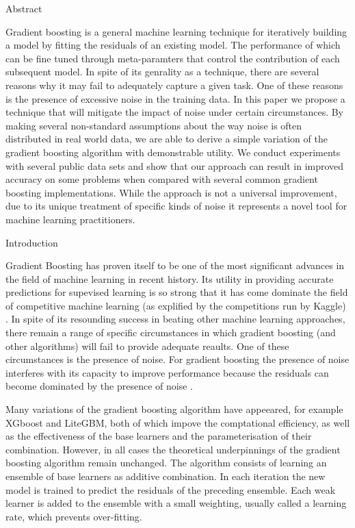Abstract

Gradient boosting is a general machine learning technique for iteratively building 
a model by fitting the residuals of an existing model. The performance of which
can be fine tuned through meta-paramters that control the contribution of each
subsequent model. In spite of its genrality as a technique, there are several reasons why it may
fail to adequately capture a given task. One of these reasons is the presence of 
excessive noise in the training data. In this paper we propose a technique that will
mitigate the impact of noise under certain circumstances. 
By making several non-standard assumptions about the way noise is often
distributed in real world data, we are able to derive a simple variation of
the gradient boosting algorithm with demonstrable utility. 
We conduct experiments with several public data sets
and show that our approach can result in improved accuracy on some problems when compared with 
several common gradient boosting implementations. While the approach is not a universal 
improvement, due to its unique treatment of specific kinds of noise it 
represents a novel tool for machine learning practitioners.


Introduction

Gradient Boosting has proven itself to be one of the most significant advances in
the field of machine learning in recent history. Its utility in providing accurate predictions
for supevised learning is so strong that
it has come dominate the field of competitive machine learning 
(as explified by the competitions run by Kaggle) \cite{kaggle_ref:2017}.
In spite of its resounding success in beating other machine learning approaches, 
there remain a range of specific circumstances in which
gradient boosting (and other algorithms) will fail to provide adequate reaults. One of these
circumstances is the presence of noise. For gradient boosting the presence of noise interferes
with its capacity to improve performance because the residuals can become 
dominated by the presence of noise \cite{}.
 
Many variations of the gradient boosting algorithm have appeeared, for example
XGboost and LiteGBM, both of which impove the comptational efficiency, as well as the effectiveness
of the base learners and the parameterisation of their combination.
However, in all cases the theoretical underpinnings of the gradient boosting algorithm
remain unchanged. The algorithm consists of learning an ensemble of base learners
as additive combination. In each iteration the new model is trained to predict the
residuals of the preceding ensemble. Each weak learner is added to the ensemble with
a small weighting, usually called a learning rate, which prevents over-fitting. 


